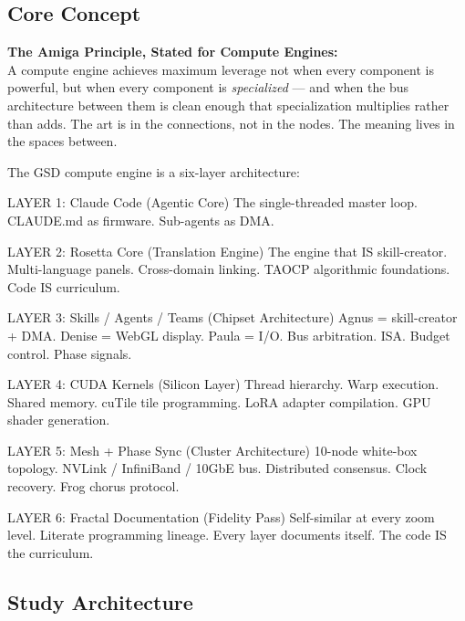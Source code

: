 \documentclass[11pt,letterpaper]{article}
\begin{document}
\subsection{Core Concept}

\begin{cyanbox}
\textbf{The Amiga Principle, Stated for Compute Engines:}\\[0.4em]
A compute engine achieves maximum leverage not when every component is powerful, but when every component is \textit{specialized} --- and when the bus architecture between them is clean enough that specialization multiplies rather than adds. The art is in the connections, not in the nodes. The meaning lives in the spaces between.
\end{cyanbox}

\vspace{0.5em}

The GSD compute engine is a six-layer architecture:

\begin{asciibox}
LAYER 1: Claude Code (Agentic Core)
  The single-threaded master loop. CLAUDE.md as firmware. Sub-agents as DMA.
  
LAYER 2: Rosetta Core (Translation Engine)
  The engine that IS skill-creator. Multi-language panels. Cross-domain linking.
  TAOCP algorithmic foundations. Code IS curriculum.
  
LAYER 3: Skills / Agents / Teams (Chipset Architecture)
  Agnus = skill-creator + DMA. Denise = WebGL display. Paula = I/O.
  Bus arbitration. ISA. Budget control. Phase signals.
  
LAYER 4: CUDA Kernels (Silicon Layer)
  Thread hierarchy. Warp execution. Shared memory. cuTile tile programming.
  LoRA adapter compilation. GPU shader generation.
  
LAYER 5: Mesh + Phase Sync (Cluster Architecture)
  10-node white-box topology. NVLink / InfiniBand / 10GbE bus.
  Distributed consensus. Clock recovery. Frog chorus protocol.
  
LAYER 6: Fractal Documentation (Fidelity Pass)
  Self-similar at every zoom level. Literate programming lineage.
  Every layer documents itself. The code IS the curriculum.
\end{asciibox}

\subsection{Study Architecture}
\end{document}
